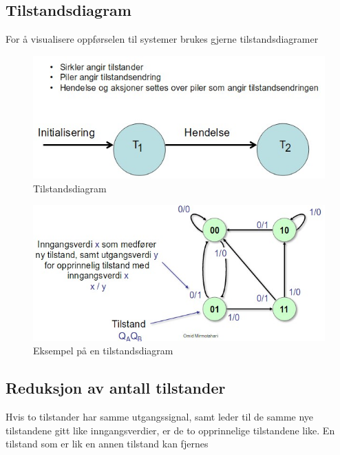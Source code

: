 \documentclass{article}
\begin{document}
	\subsection{Tilstandsdiagram}
	
	For å visualisere oppførselen til systemer brukes gjerne tilstandsdiagramer
	
	\begin{figure}[H]
		\includegraphics[scale = 0.6]{tilstanddiagram.jpg}
		\caption{Tilstandsdiagram}
	\end{figure}
	
	
	\begin{figure}[H]
		\includegraphics[scale = 0.6]{tilstandeks.jpg}
		\caption{Eksempel på en tilstandsdiagram}
	\end{figure}
	
	\subsection{Reduksjon av antall tilstander}
	 Hvis to tilstander har samme utgangssignal, samt leder til de samme nye tilstandene gitt like inngangsverdier,
	 er de to opprinnelige tilstandene like. En tilstand som er lik en annen tilstand kan fjernes
	 
\end{document}
